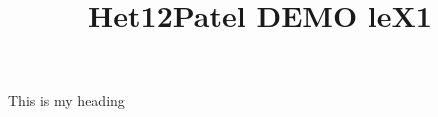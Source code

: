 \documentclass{article}
\title{Het12Patel DEMO leX1}
\begin{document}
\maketitle
This is my heading
\end{document}
